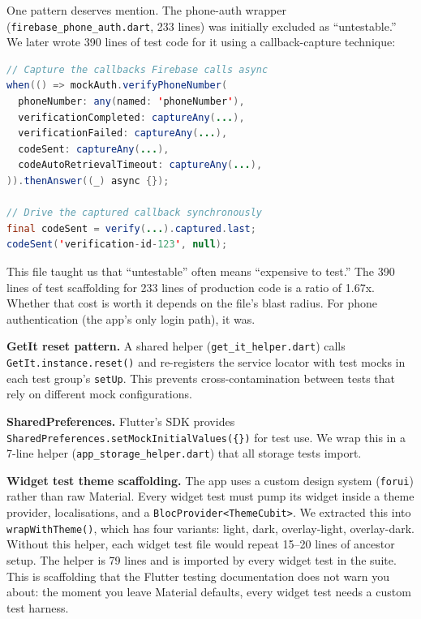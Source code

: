 \documentclass[10pt,journal,compsoc]{IEEEtran}
\begin{document}
One pattern deserves mention. The phone-auth wrapper
(\texttt{firebase\_phone\_auth.dart}, 233 lines) was initially excluded as
``untestable.'' We later wrote 390 lines of test code for it using a
callback-capture technique:

\begin{lstlisting}[language=Java,caption={Capturing Firebase verification callbacks}]
// Capture the callbacks Firebase calls async
when(() => mockAuth.verifyPhoneNumber(
  phoneNumber: any(named: 'phoneNumber'),
  verificationCompleted: captureAny(...),
  verificationFailed: captureAny(...),
  codeSent: captureAny(...),
  codeAutoRetrievalTimeout: captureAny(...),
)).thenAnswer((_) async {});

// Drive the captured callback synchronously
final codeSent = verify(...).captured.last;
codeSent('verification-id-123', null);
\end{lstlisting}

This file taught us that ``untestable'' often means ``expensive to test.''
The 390 lines of test scaffolding for 233 lines of production code is a
ratio of 1.67x. Whether that cost is worth it depends on the file's blast
radius. For phone authentication (the app's only login path), it was.

\textbf{GetIt reset pattern.}
A shared helper (\texttt{get\_it\_helper.dart}) calls
\texttt{GetIt.instance.reset()} and re-registers the service locator with
test mocks in each test group's \texttt{setUp}. This prevents
cross-contamination between tests that rely on different mock
configurations.

\textbf{SharedPreferences.}
Flutter's SDK provides \texttt{SharedPreferences.setMockInitialValues(\{\})}
for test use. We wrap this in a 7-line helper
(\texttt{app\_storage\_helper.dart}) that all storage tests import.

\textbf{Widget test theme scaffolding.}
The app uses a custom design system (\texttt{forui}) rather than raw
Material. Every widget test must pump its widget inside a theme provider,
localisations, and a \texttt{BlocProvider<ThemeCubit>}. We extracted this
into \texttt{wrapWithTheme()}, which has four variants: light, dark,
overlay-light, overlay-dark. Without this helper, each widget test file
would repeat 15--20 lines of ancestor setup. The helper is 79 lines and
is imported by every widget test in the suite. This is scaffolding that
the Flutter testing documentation does not warn you about: the moment you
leave Material defaults, every widget test needs a custom test harness.
\end{document}
